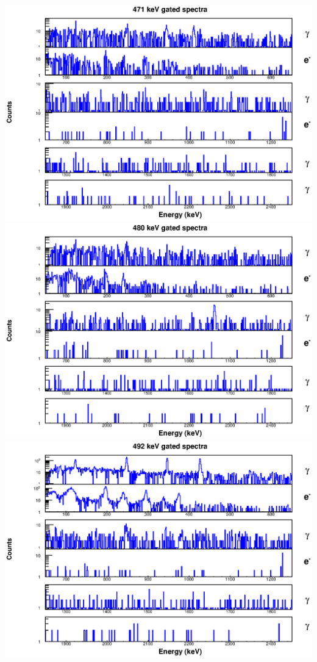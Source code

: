 \begin{landscape}
\includegraphics[scale=1.1]{154Gd_Appendix/471_combined.eps}
\includegraphics[scale=1.1]{154Gd_Appendix/480_combined.eps}
\includegraphics[scale=1.1]{154Gd_Appendix/492_combined.eps}

\end{landscape}
